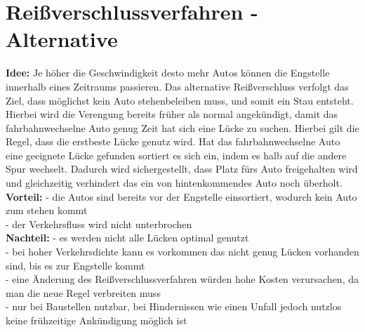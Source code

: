 \section{Reißverschlussverfahren - Alternative}
\textbf{Idee:} Je höher die Geschwindigkeit desto mehr Autos können die Engstelle innerhalb eines Zeitraums passieren. Das alternative Reißverschluss verfolgt das Ziel, dass möglichst kein Auto stehenbeleiben muss, und somit ein Stau entsteht. Hierbei wird die Verengung bereits früher als normal angekündigt, damit das fahrbahnwechselne Auto genug Zeit hat sich eine Lücke zu suchen. Hierbei gilt die Regel, dass die erstbeste Lücke genutz wird. Hat das fahrbahnwechselne Auto eine geeignete Lücke gefunden sortiert es sich ein, indem es halb auf die andere Spur wechselt. Dadurch wird sichergestellt, dass Platz fürs Auto freigehalten wird und gleichzeitig verhindert das ein von hintenkommendes Auto noch überholt. \\
\textbf{Vorteil:} - die Autos sind bereits vor der Engstelle einsortiert, wodurch kein Auto zum stehen kommt\\
- der Verkehrsfluss wird nicht unterbrochen\\
\textbf{Nachteil:} - es werden nicht alle Lücken optimal genutzt\\
- bei hoher Verkehrsdichte kann es vorkommen das nicht genug Lücken vorhanden sind, bis es zur Engstelle kommt\\
- eine Änderung des Reißverschlussverfahren würden hohe Kosten verursachen, da man die neue Regel verbreiten muss\\
- nur bei Baustellen nutzbar, bei Hindernissen wie einen Unfall jedoch nutzlos keine frühzeitige Ankündigung möglich ist\\